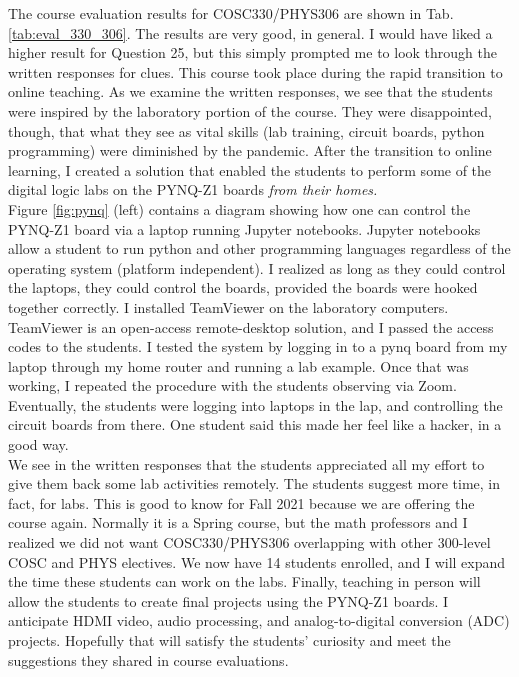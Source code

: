 \documentclass[../../main.tex]{subfiles}
\begin{document}
The course evaluation results for COSC330/PHYS306 are shown in Tab. \ref{tab:eval_330_306}.  The results are very good, in general.  I would have liked a higher result for Question 25, but this simply prompted me to look through the written responses for clues.  This course took place during the rapid transition to online teaching.  As we examine the written responses, we see that the students were inspired by the laboratory portion of the course.  They were disappointed, though, that what they see as vital skills (lab training, circuit boards, python programming) were diminished by the pandemic.  After the transition to online learning, I created a solution that enabled the students to perform some of the digital logic labs on the PYNQ-Z1 boards \textit{from their homes.}
\\
\vspace{0.25cm}
Figure \ref{fig:pynq} (left) contains a diagram showing how one can control the PYNQ-Z1 board via a laptop running Jupyter notebooks.  Jupyter notebooks allow a student to run python and other programming languages regardless of the operating system (platform independent).  I realized as long as they could control the laptops, they could control the boards, provided the boards were hooked together correctly.  I installed TeamViewer on the laboratory computers.  TeamViewer is an open-access remote-desktop solution, and I passed the access codes to the students.  I tested the system by logging in to a pynq board from my laptop through my home router and running a lab example.  Once that was working, I repeated the procedure with the students observing via Zoom.  Eventually, the students were logging into laptops in the lap, and controlling the circuit boards from there.  One student said this made her feel like a hacker, in a good way.
\\
\vspace{0.25cm}
We see in the written responses that the students appreciated all my effort to give them back some lab activities remotely.  The students suggest more time, in fact, for labs.  This is good to know for Fall 2021 because we are offering the course again.  Normally it is a Spring course, but the math professors and I realized we did not want COSC330/PHYS306 overlapping with other 300-level COSC and PHYS electives.  We now have 14 students enrolled, and I will expand the time these students can work on the labs.  Finally, teaching in person will allow the students to create final projects using the PYNQ-Z1 boards.  I anticipate HDMI video, audio processing, and analog-to-digital conversion (ADC) projects.  Hopefully that will satisfy the students' curiosity and meet the suggestions they shared in course evaluations.
\end{document}
